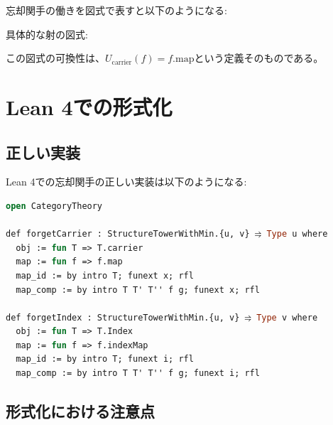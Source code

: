 \documentclass[a4paper,12pt]{article}
\theoremstyle{definition}
\begin{document}
忘却関手の働きを図式で表すと以下のようになる:

\begin{center}
\end{center}

具体的な射の図式:

\begin{center}
\end{center}

この図式の可換性は、$U_{\text{carrier}}(f) = f.\text{map}$という定義そのものである。

\section{Lean 4での形式化}

\subsection{正しい実装}

Lean 4での忘却関手の正しい実装は以下のようになる:

\begin{lstlisting}[style=leanstyle, language=ML]
open CategoryTheory

def forgetCarrier : StructureTowerWithMin.{u, v} ⥤ Type u where
  obj := fun T => T.carrier
  map := fun f => f.map
  map_id := by intro T; funext x; rfl
  map_comp := by intro T T' T'' f g; funext x; rfl

def forgetIndex : StructureTowerWithMin.{u, v} ⥤ Type v where
  obj := fun T => T.Index
  map := fun f => f.indexMap
  map_id := by intro T; funext i; rfl
  map_comp := by intro T T' T'' f g; funext i; rfl
\end{lstlisting}

\subsection{形式化における注意点}
\end{document}
